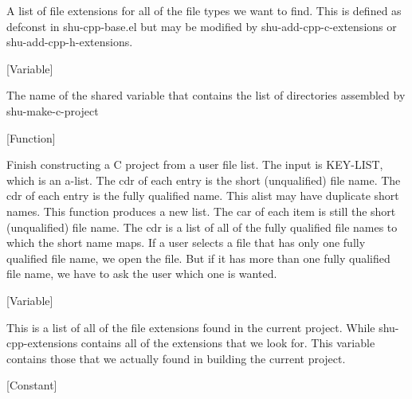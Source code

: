 \begin{doc-string}
A list of file extensions for all of the file types we want to find.  This is defined
as defconst in shu-cpp-base.el but may be modified by shu-add-cpp-c-extensions or
shu-add-cpp-h-extensions.
\end{doc-string}

\vspace{1em}
\noindent
{}
\usebox{\funcname}
 \hfill [Variable]

\begin{doc-string}
The name of the shared variable that contains the list of directories assembled
by shu-make-c-project
\end{doc-string}

\vspace{1em}
\noindent
{}
\usebox{\funcname}
 \hfill [Function]

\begin{doc-string}
Finish constructing a C project from a user file list.  The input is
KEY-LIST, which is an a-list.  The cdr of each entry is the short (unqualified)
file name.  The cdr of each entry is the fully qualified name.  This alist may
have duplicate short names.  This function produces a new list.  The car of each
item is still the short (unqualified) file name.  The cdr is a list of all of
the fully qualified file names to which the short name maps.  If a user selects
a file that has only one fully qualified file name, we open the file.  But if it
has more than one fully qualified file name, we have to ask the user which one
is wanted.
\end{doc-string}

\vspace{1em}
\noindent
{}
\usebox{\funcname}
 \hfill [Variable]

\begin{doc-string}
This is a list of all of the file extensions found in the current project.  While
shu-cpp-extensions contains all of the extensions that we look for.  This variable
contains those that we actually found in building the current project.
\end{doc-string}

\vspace{1em}
\noindent
{}
\usebox{\funcname}
 \hfill [Constant]

